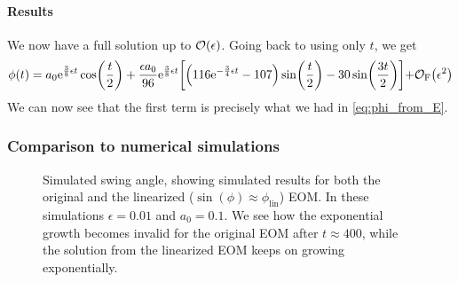\paragraph{Results}
We now have a full solution up to $\order{\epsilon}$.
Going back to using only $t$, we get
\begin{equation}
\phi(t)=a_0\mathrm{e}^{\frac{3}{8}\epsilon{t}}\cos(\frac{t}{2})
+\frac{\epsilon a_0}{96}\mathrm{e}^{\frac{3}{8}\epsilon{t}}\qty[
\qty(116\mathrm{e}^{-\frac{3}{4}\epsilon{t}}-107)
\sin(\frac{t}{2})
-30\sin(\frac{3t}{2})]
{+}\mathcal{O}_\text{F}\qty(\epsilon^2)
\end{equation}
We can now see that the first term is precisely what we had in
\eqref{eq:phi_from_E}. 



\subsubsection{Comparison to numerical simulations}
\begin{figure}\centering
\caption{Simulated swing angle, showing simulated results for both the
  original and the linearized ($\sin(\phi)\approx\phi_\text{lin}$)
  EOM. In these simulations $\epsilon=0.01$ and $a_0=0.1$. We see how the
  exponential growth becomes invalid for the original EOM after
  $t\approx400$, while the solution from the linearized EOM keeps on
  growing exponentially. 
}
\label{fig:sim}
\end{figure}

